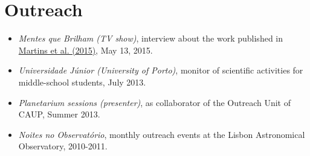 \documentclass[10pt]{article}
\makeatletter
\renewcommand{\labelenumi}{\@biblabel{A\theenumi}} %
\makeatother
\begin{document}








\fi

\ifoutreach

\section{Outreach}
\begin{itemize}
\item \emph{Mentes que Brilham (TV show)}, interview about the work published in \href{http://adsabs.harvard.edu/cgi-bin/nph-abs_connect?fforward=http://dx.doi.org/10.1051/0004-6361/201425298}{Martins et al. (2015)}, May 13, 2015.
\item \emph{Universidade Júnior (University of Porto)}, monitor of scientific activities for middle-school students, July 2013.
\item \emph{Planetarium sessions (presenter)}, as collaborator of the Outreach Unit of CAUP, Summer 2013.
\item \emph{Noites no Observatório}, monthly outreach events at the Lisbon Astronomical Observatory, 2010-2011.
\end{itemize}
\end{document}
